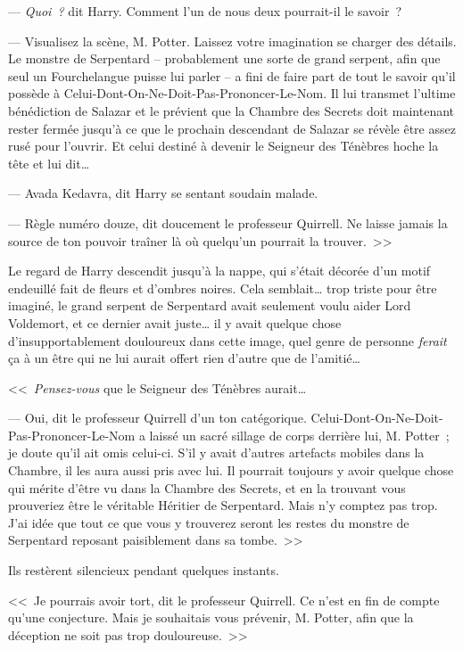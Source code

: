 --- \emph{Quoi~?} dit Harry. Comment l'un de nous deux pourrait-il le savoir~?

--- Visualisez la scène, M. Potter. Laissez votre imagination se charger des détails. Le monstre de Serpentard -- probablement une sorte de grand serpent, afin que seul un Fourchelangue puisse lui parler -- a fini de faire part de tout le savoir qu'il possède à Celui-Dont-On-Ne-Doit-Pas-Prononcer-Le-Nom. Il lui transmet l'ultime bénédiction de Salazar et le prévient que la Chambre des Secrets doit maintenant rester fermée jusqu'à ce que le prochain descendant de Salazar se révèle être assez rusé pour l'ouvrir. Et celui destiné à devenir le Seigneur des Ténèbres hoche la tête et lui dit…

--- Avada Kedavra, dit Harry se sentant soudain malade.

--- Règle numéro douze, dit doucement le professeur Quirrell. Ne laisse jamais la source de ton pouvoir traîner là où quelqu'un pourrait la trouver.~>>

Le regard de Harry descendit jusqu'à la nappe, qui s'était décorée d'un motif endeuillé fait de fleurs et d'ombres noires. Cela semblait… trop triste pour être imaginé, le grand serpent de Serpentard avait seulement voulu aider Lord Voldemort, et ce dernier avait juste… il y avait quelque chose d'insupportablement douloureux dans cette image, quel genre de personne \emph{ferait} ça à un être qui ne lui aurait offert rien d'autre que de l'amitié…

<<~\emph{Pensez-vous} que le Seigneur des Ténèbres aurait…

--- Oui, dit le professeur Quirrell d'un ton catégorique. Celui-Dont-On-Ne-Doit-Pas-Prononcer-Le-Nom a laissé un sacré sillage de corps derrière lui, M. Potter~; je doute qu'il ait omis celui-ci. S'il y avait d'autres artefacts mobiles dans la Chambre, il les aura aussi pris avec lui. Il pourrait toujours y avoir quelque chose qui mérite d'être vu dans la Chambre des Secrets, et en la trouvant vous prouveriez être le véritable Héritier de Serpentard. Mais n'y comptez pas trop. J'ai idée que tout ce que vous y trouverez seront les restes du monstre de Serpentard reposant paisiblement dans sa tombe.~>>

Ils restèrent silencieux pendant quelques instants.

<<~Je pourrais avoir tort, dit le professeur Quirrell. Ce n'est en fin de compte qu'une conjecture. Mais je souhaitais vous prévenir, M. Potter, afin que la déception ne soit pas trop douloureuse.~>>

